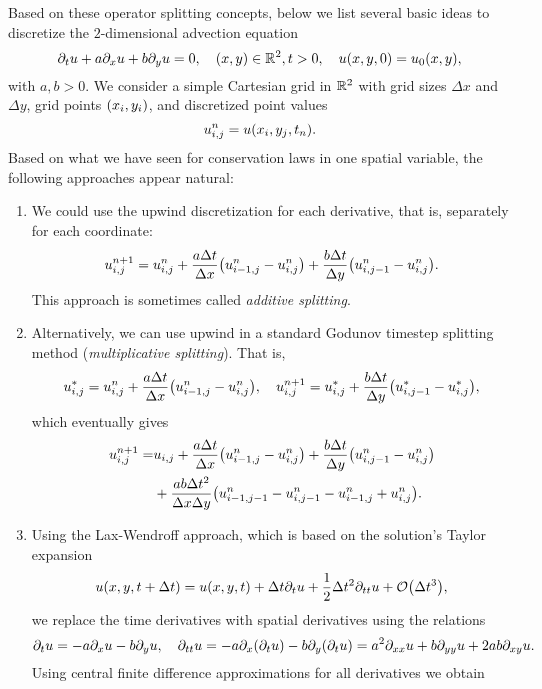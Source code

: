 Based on these operator splitting concepts, below we list several basic ideas to discretize the \(2\)-dimensional advection equation
\[
	\partial_t u + a\partial_x u + b\partial_y u = 0, \quad \parentheses*{x, y} \in \R^2, t > 0, \quad u\parentheses*{x, y, 0} = u_0\parentheses*{x, y},
\]
with \(a, b > 0\).
We consider a simple Cartesian grid in \(\R^2\) with grid sizes \(\Delta x\) and \(\Delta y\), grid points \(\parentheses*{x_i, y_i}\), and discretized point values
\[
	u_{i, j}^n = u\parentheses*{x_i, y_j, t_n}.
\]
Based on what we have seen for conservation laws in one spatial variable, the following approaches appear natural:
\begin{enumerate}
	\item We could use the upwind discretization for each derivative, that is, separately for each coordinate:
	\[
		u_{i, j}^{n + 1} = u_{i,j}^n + \frac{a\Delta t}{\Delta x}\parentheses*{u_{i - 1, j}^n - u_{i, j}^n} + \frac{b\Delta t}{\Delta y}\parentheses*{u_{i, j - 1}^n - u_{i, j}^n}.
	\]
	This approach is sometimes called \emph{additive splitting}.
	\item Alternatively, we can use upwind in a standard Godunov timestep splitting method (\emph{multiplicative splitting}).
	That is,
	\[
		u_{i, j}^* = u_{i, j}^n + \frac{a\Delta t}{\Delta x}\parentheses*{u_{i - 1, j}^n - u_{i, j}^n}, \quad u_{i, j}^{n + 1} = u_{i, j}^* + \frac{b\Delta t}{\Delta y}\parentheses*{u_{i, j - 1}^* - u_{i, j}^*},
	\]
	which eventually gives
	\begin{align*}
		u_{i, j}^{n + 1} = &u_{i, j} + \frac{a\Delta t}{\Delta x}\parentheses*{u_{i - 1, j}^n - u_{i, j}^n} + \frac{b\Delta t}{\Delta y}\parentheses*{u_{i, j - 1}^n - u_{i, j}^n}\\
		&+ \frac{ab\Delta t^2}{\Delta x\Delta y}\parentheses*{u_{i - 1, j - 1}^n - u_{i, j - 1}^n - u_{i - 1, j}^n + u_{i, j}^n}.
	\end{align*}
	\item Using the Lax-Wendroff approach, which is based on the solution's Taylor expansion
	\[
		u\parentheses*{x, y, t + \Delta t} = u\parentheses*{x, y, t} + \Delta t\partial_t u + \frac{1}{2}\Delta t^2 \partial_{tt}u + \mathcal{O}\parentheses*{\Delta t^3},
	\]
	we replace the time derivatives with spatial derivatives using the relations
	\[
		\partial_t u = -a\partial_x u - b\partial_y u, \quad \partial_{tt}u = -a\partial_x \parentheses*{\partial_t u} - b\partial_y \parentheses*{\partial_t u} = a^2 \partial_{xx}u + b\partial_{yy}u + 2ab\partial_{xy}u.
	\]
	Using central finite difference approximations for all derivatives we obtain

\end{enumerate}
